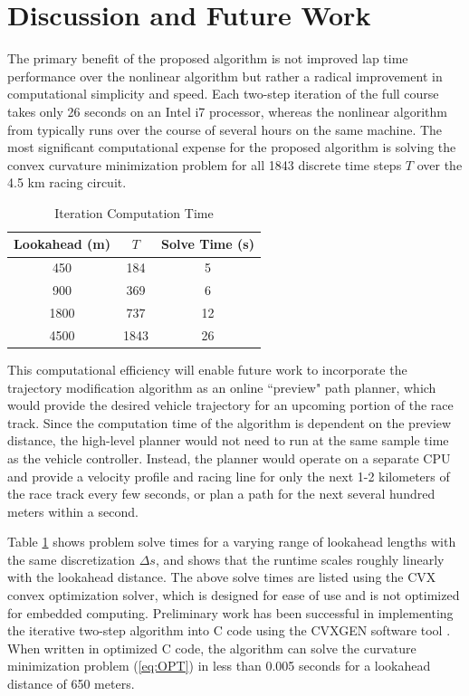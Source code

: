 \documentclass[twocolumn,10pt]{asme2ej}
\begin{document}
\section{Discussion and Future Work}
\label{sec:DISCUSSION}

The primary benefit of the proposed algorithm is not improved lap time performance
over the nonlinear algorithm but rather a radical improvement in computational simplicity and speed. Each two-step iteration of the full
course takes only 26 seconds on an Intel i7 processor, whereas the nonlinear algorithm from \cite{theodosis} typically runs over the course of several hours on the same
machine. The most significant computational expense for the proposed algorithm is solving the convex curvature minimization problem for
all 1843 discrete time steps $T$ over the 4.5 km racing circuit.

\begin{table}[h]
\begin{center}
\caption{Iteration Computation Time}\label{tb:solvetime}
\begin{tabular}{ccc}
Lookahead (m) & $T$ & Solve Time (s) \\\hline
450& 184 &5 \\
900&  369 & 6 \\
1800& 737 & 12 \\
4500& 1843& 26 \\\hline
\end{tabular}
\end{center}
\end{table}
This computational efficiency will enable future work to incorporate the trajectory modification algorithm as an online
 ``preview" path planner, which would provide the desired vehicle trajectory for an upcoming portion of the race track. 
 Since the computation time of the algorithm is dependent on the preview distance, 
 the high-level planner would not need to run at the same sample time as the vehicle controller. Instead, the planner would operate on a separate CPU and provide a velocity profile and racing line for only
 the next 1-2 kilometers of the race track every few seconds, or plan a path for the next several hundred meters within a second.
 
 Table \ref{tb:solvetime} shows problem solve times for a varying range of lookahead lengths with the same discretization $\Delta s$,
 and shows that the runtime scales roughly linearly with the lookahead distance. The above solve times are listed using the CVX convex optimization solver, which 
 is designed for ease of use and is not optimized for embedded computing. Preliminary work has been successful
 in implementing the iterative two-step algorithm into C code using the CVXGEN software tool \cite{boydcvxgen}. When written
 in optimized C code, the algorithm can solve the curvature minimization problem (\ref{eq:OPT}) in less than 0.005 seconds for a lookahead distance of 650 meters.
 
\end{document}
